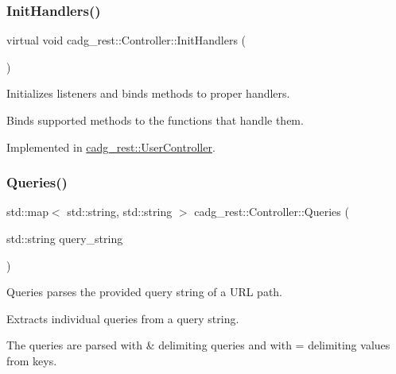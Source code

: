 \subsubsection{\texorpdfstring{InitHandlers()}{InitHandlers()}}
{\footnotesize\ttfamily virtual void cadg\+\_\+rest\+::\+Controller\+::\+Init\+Handlers (\begin{DoxyParamCaption}{ }\end{DoxyParamCaption})\hspace{0.3cm}{\ttfamily [pure virtual]}}



Initializes listeners and binds methods to proper handlers. 

Binds supported methods to the functions that handle them. 

Implemented in \mbox{\hyperlink{classcadg__rest_1_1_user_controller_a213210b1e1f8f7417133f3290fbb9b67}{cadg\+\_\+rest\+::\+User\+Controller}}.

\mbox{\label{classcadg__rest_1_1_controller_a6405c6b368ec22d3c870bdd1db92490a}} 
\subsubsection{\texorpdfstring{Queries()}{Queries()}}
{\footnotesize\ttfamily std\+::map$<$ std\+::string, std\+::string $>$ cadg\+\_\+rest\+::\+Controller\+::\+Queries (\begin{DoxyParamCaption}\item[{std\+::string}]{query\+\_\+string }\end{DoxyParamCaption})\hspace{0.3cm}{\ttfamily [static]}}



Queries parses the provided query string of a U\+RL path. 

Extracts individual queries from a query string.

The queries are parsed with \textquotesingle{}\&\textquotesingle{} delimiting queries and with \textquotesingle{}=\textquotesingle{} delimiting values from keys.


